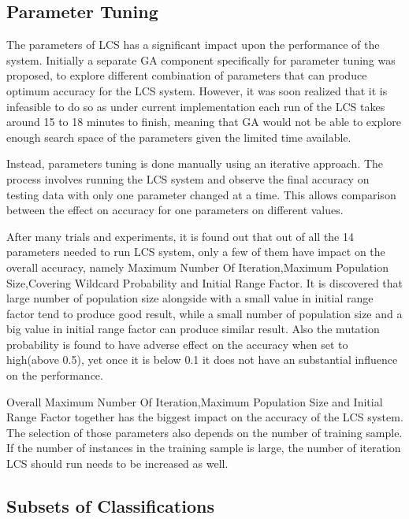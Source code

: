 \documentclass[11pt]{article}
\begin{document}
\subsection{Parameter Tuning}
\label{sec:paramTune}

The parameters of LCS has a significant impact upon the performance of the system. Initially a separate GA component specifically for parameter tuning was proposed, to explore different combination of parameters that can produce optimum accuracy for the LCS system. However, it was soon realized that it is infeasible to do so as under current implementation each run of the LCS takes around 15 to 18 minutes to finish, meaning that GA would not be able to explore enough search space of the parameters given the limited time available.

Instead, parameters tuning is done manually using an iterative approach. The process involves running the LCS system and observe the final accuracy on testing data with only one parameter changed at a time. This allows comparison between the effect on accuracy for one parameters on different values.

After many trials and experiments, it is found out that out of all the 14 parameters needed to run LCS system, only a few of them have impact on the overall accuracy, namely Maximum Number Of Iteration,Maximum Population Size,Covering Wildcard Probability and Initial Range Factor. It is discovered that large number of population size alongside with a small value in initial range factor tend to produce good result, while a small number of population size and a big value in initial range factor can produce similar result. Also the mutation probability is found to have adverse effect on the accuracy when set to high(above 0.5), yet once it is below 0.1 it does not have an substantial influence on the performance.

Overall Maximum Number Of Iteration,Maximum Population Size and Initial Range Factor together has the biggest impact on the accuracy of the LCS system. The selection of those parameters also depends on the number of training sample. If the number of instances in the training sample is large, the number of iteration LCS should run needs to be increased as well.



\subsection{Subsets of Classifications}
\label{sec:subsets}
\end{document}
